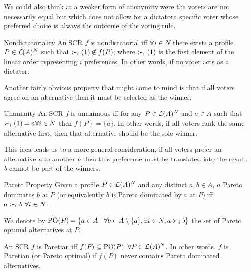 	We could also think at  a weaker form of anonymity were the voters are not necessarily equal but which does not allow for a dictator\textemdash a specific voter whose preferred choice is always the outcome of the voting rule. 

	\begin{genthm}{Nondictatoriality}
	An \acs{SCR} $f$ is nondictatorial iff $\forall i \in N$ there exists a profile $P \in\mathcal{L}(A)^{N}$ such that $\prefi(1) \not\in f(P)$; where $\prefi(1)$ is the first element of the linear order representing $i$ preferences. In other words, if no voter acts as a dictator.
	\end{genthm}


	Another fairly obvious property that might come to mind is that if all voters agree on an alternative then it must be selected as the winner.
	
	\begin{genthm}{Unanimity}
	An \acs{SCR} $f$ is unanimous iff for any $P\in\mathcal{L}(A)^{N}$ and $a \in A$ such that $\prefi(1)=a \forall i \in N$ then $f(P)=\{a\}$. In other words, if all voters rank the same alternative first, then that alternative should be the sole winner.	
	\end{genthm}

	This idea leads us to a more general consideration, if all voters prefer an alternative \textit{a} to another \textit{b} then this preference must be translated into the result: \textit{b} cannot be part of the winners.

	\begin{genthm}{Pareto Property}
	Given a profile $P\in\mathcal{L}(A)^{N}$ and any distinct $a,b\in A$, $a$ Pareto dominates $b$ at $P$ (or equivalently $b$ is Pareto dominated by $a$ at $P$) iff $a \prefi b,\forall i\in N$.
	
	We denote by $\paretopt(P)= \set{a \in A \suchthat \forall b \in A\setminus\{a\}, \exists i \in N, a \pref_i b}$ the set of Pareto optimal alternatives at $P$.
	
	An \acs{SCR} $f$ is Paretian iff $f(P)\subseteq\text{PO}(P)$ $\forall P\in\mathcal{L}(A)^{N}$. In other words, $f$ is Paretian (or Pareto optimal) if $f(P)$ never contains Pareto dominated alternatives.	
	\end{genthm}

